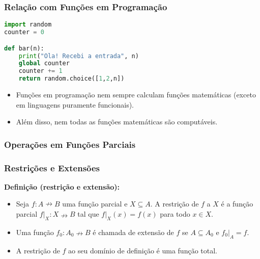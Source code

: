 \begin{frame}[fragile]
  \frametitle{Relação com Funções em Programação}

  \begin{lstlisting}[language=Python, basicstyle=\ttfamily, keywordstyle=\color{blue}, commentstyle=\color{green}, stringstyle=\color{red}]
import random
counter = 0

def bar(n):
    print("Ola! Recebi a entrada", n)
    global counter
    counter += 1
    return random.choice([1,2,n])
  \end{lstlisting}

  \begin{itemize}
    \item Funções em programação nem sempre calculam funções matemáticas (exceto em linguagens puramente funcionais).
    \item Além disso, nem todas as funções matemáticas são computáveis.
  \end{itemize}
\end{frame}

\begin{frame}
  \frametitle{Operações em Funções Parciais}

\end{frame}

\begin{frame}
  \frametitle{Restrições e Extensões}

  \textbf{Definição (restrição e extensão):}
  \begin{itemize}
    \item Seja \( f: A \nrightarrow B \) uma função parcial e \( X \subseteq A \). A restrição de \( f \) a \( X \) é a função parcial \( f|_X: X \nrightarrow B \) tal que \( f|_X(x) = f(x) \) para todo \( x \in X \).

    \item Uma função \( f_0: A_0 \nrightarrow B \) é chamada de extensão de \( f \) se \( A \subseteq A_0 \) e \( f_0|_A = f \).

    \item A restrição de \( f \) ao seu domínio de definição é uma função total.
  \end{itemize}

\end{frame}

